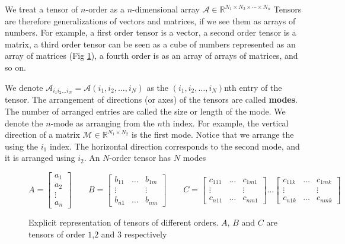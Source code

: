 \documentclass[11pt,a4paper,openright,oneside]{book}
\numberwithin{equation}{section}
\begin{document}
\nocite{yokotaVeryBasicsTensors2024}
We treat a tensor of $n$-order as a $n$-dimensional array $\mathcal{A} \in \mathbb{R}^{N_1\times N_2 \times \cdots \times N_n}$
Tensors are therefore generalizations of vectors and matrices, if we see them as arrays of numbers. For example, a first order
tensor is a vector, a second order tensor is a matrix, a third order tensor can be seen as a cube of numbers represented as an
array of matrices (Fig \ref{fig:tint}), a fourth order is as an array of arrays of matrices, and so on.

We denote $\mathcal{A}_{i_1 i_2 \dots i_N} = \mathcal{A}(i_1, i_2, \dots, i_N)$ as the $(i_1, i_2, \dots, i_N)$nth entry of the
tensor. The arrangement of directions (or axes) of the tensors are called \textbf{modes}. The number of arranged
entries are called the size or length of the mode. We denote the $n$-mode as arranging from the $n$th index. For example,
the vertical direction of a matrix $\mathcal{M} \in \mathbb{R}^{N_1 \times N_2}$ is the first mode. Notice that we arrange the 
using the $i_1$ index. The horizontal direction corresponds to the second mode, and it is arranged using $i_2$. An $N$-order
tensor has $N$ modes


\begin{figure}
\begin{center}
    $$A = \begin{bmatrix}
        a_1 \\
        a_2 \\
        \vdots \\
        a_n
    \end{bmatrix} \qquad
    B = \begin{bmatrix}
        b_{11} & \dots & b_{1m} \\
        \vdots & & \vdots \\
        b_{n1} & \dots & b_{nm}
    \end{bmatrix}
    \qquad
    C=\begin{bmatrix}
        c_{111} & \dots & c_{1m1} \\
        \vdots & & \vdots \\
        c_{n11} & \dots & c_{nm1} 
    \end{bmatrix}
    \dots
\begin{bmatrix}
        c_{11k} & \dots & c_{1mk}\\
        \vdots & & \vdots \\
        c_{n1k} & \dots & c_{nmk} 
    \end{bmatrix}
    \
    $$

\caption{
    Explicit representation of tensors of different orders. $A$, $B$ and $C$ are tensors of order $1$,$2$ and $3$ respectively
}
\end{center}
\label{fig:tint}

\end{figure}
\end{document}
